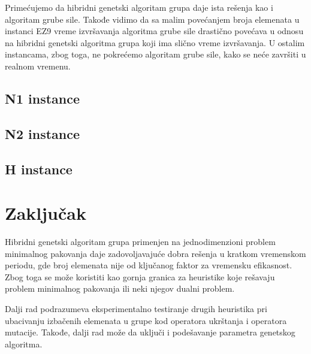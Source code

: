 \documentclass[a4paper,12pt,twocolumn]{article}
\begin{document}


Primećujemo da hibridni genetski algoritam grupa daje ista rešenja
kao i algoritam grube sile. Takođe vidimo da sa malim povećanjem
broja elemenata u instanci EZ9 vreme izvršavanja algoritma grube 
sile drastično povećava u odnosu na hibridni genetski algoritma 
grupa koji ima slično vreme izvršavanja. U ostalim instancama, 
zbog toga, ne pokrećemo algoritam grube sile, kako se neće 
završiti u realnom vremenu.

\subsection{N1 instance}





\subsection{N2 instance}


\subsection{H instance}



\section{Zaključak}

Hibridni genetski algoritam grupa primenjen na jednodimenzioni problem
minimalnog pakovanja daje zadovoljavajuće dobra rešenja u kratkom vremenskom
periodu, gde broj elemenata nije od ključanog faktor za vremensku efikasnost.
Zbog toga se može koristiti kao gornja granica za heuristike koje rešavaju
problem minimalnog pakovanja ili neki njegov dualni problem.

Dalji rad podrazumeva eksperimentalno testiranje drugih heuristika pri
ubacivanju izbačenih elemenata u grupe kod operatora ukrštanja i operatora
mutacije. Takođe, dalji rad može da uključi i podešavanje parametra genetskog 
algoritma.

\nocite{*}

\printbibliography[title={Literatura}]
\end{document}
